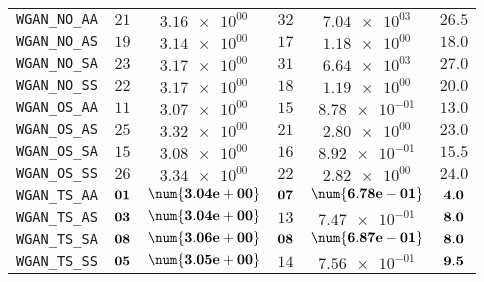 \begin{xltabular}{\textwidth}{l||CC|CC||C}
	\texttt{WGAN\_NO\_AA} & $ 21$ & $ \num{3.16e+00}$ & $ 32$ & $ \num{7.04e+03}$ &$ 26.5$  \\
	\texttt{WGAN\_NO\_AS} & $ 19$ & $ \num{3.14e+00}$ & $ 17$ & $ \num{1.18e+00}$ &$ 18.0$  \\
	\texttt{WGAN\_NO\_SA} & $ 23$ & $ \num{3.17e+00}$ & $ 31$ & $ \num{6.64e+03}$ &$ 27.0$  \\
	\texttt{WGAN\_NO\_SS} & $ 22$ & $ \num{3.17e+00}$ & $ 18$ & $ \num{1.19e+00}$ &$ 20.0$  \\
	\texttt{WGAN\_OS\_AA} & $ 11$ & $ \num{3.07e+00}$ & $ 15$ & $ \num{8.78e-01}$ &$ 13.0$  \\
	\texttt{WGAN\_OS\_AS} & $ 25$ & $ \num{3.32e+00}$ & $ 21$ & $ \num{2.80e+00}$ &$ 23.0$  \\
	\texttt{WGAN\_OS\_SA} & $ 15$ & $ \num{3.08e+00}$ & $ 16$ & $ \num{8.92e-01}$ &$ 15.5$  \\
	\texttt{WGAN\_OS\_SS} & $ 26$ & $ \num{3.34e+00}$ & $ 22$ & $ \num{2.82e+00}$ &$ 24.0$  \\
	\texttt{WGAN\_TS\_AA} & $\bf 01$ & $\bf \num{3.04e+00}$ & $\bf 07$ & $\bf \num{6.78e-01}$ &$\bf 4.0$  \\
	\texttt{WGAN\_TS\_AS} & $\bf 03$ & $\bf \num{3.04e+00}$ & $ 13$ & $ \num{7.47e-01}$ &$\bf 8.0$  \\
	\texttt{WGAN\_TS\_SA} & $\bf 08$ & $\bf \num{3.06e+00}$ & $\bf 08$ & $\bf \num{6.87e-01}$ &$\bf 8.0$  \\
	\texttt{WGAN\_TS\_SS} & $\bf 05$ & $\bf \num{3.05e+00}$ & $ 14$ & $ \num{7.56e-01}$ &$\bf 9.5$  \\ \hline

\end{xltabular}
